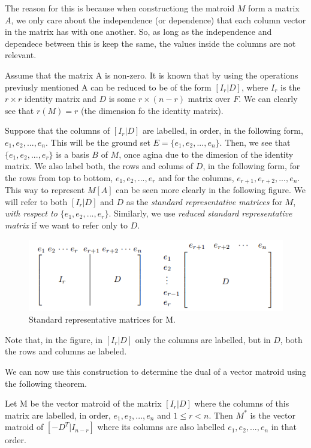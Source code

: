 The reason for this is because when constructiong the matroid $M$ form a matrix $A$, we only care about the independence (or dependence) that each column vector in the matrix has with one another. So, as long as the independence and dependece between this is keep the same, the values inside the columns are not relevant.

Assume that the matrix A is non-zero. It is known that by using the operations previusly mentioned A can be reduced to be of the form $[I_r|D]$, where $I_r$ is the $r \times r$ identity matrix and $D$ is some $r \times (n-r)$ matrix over $F$. We can clearly see that $r(M)=r$ (the dimension fo the identity matrix). 

Suppose that the columns of $[I_r|D]$ are labelled, in order, in the following form, $e_1, e_2,...,e_n$. This will be the ground set $E=\{e_1, e_2,...,e_n\}$. Then, we see that $\{e_1, e_2,...,e_r\}$ is a basis $B$ of $M$, once agina due to the dimesion of the identity matrix. We also label both, the rows and colums of $D$, in the following form, for the rows from top to bottom, $e_1, e_2,...,e_r$ and for the columns,  $e_{r+1}, e_{r+2},...,e_n$. This way to represent $M[A]$ can be seen more clearly in the following figure. We will refer to both $[I_r|D]$ and $D$ as the \textit{standard representative matrices} for $M$, \textit{with respect to $\{e_1, e_2,...,e_r\}$}. Similarly, we use \textit{reduced standard representative matrix} if we want to refer only to $D$.

\begin{figure}[H]
    \centering
    \includegraphics{SRF.png}
    \caption{Standard representative matrices for M. \cite{oxley1}}
    \label{fig:enter-label}
\end{figure}
Note that, in the figure, in $[I_r|D]$ only the columns are labelled, but in $D$, both the rows and columns ae labeled.

We can now use this construction to determine the dual of a vector matroid using the following theorem.

\begin{theorem}\label{DualRepMat}
    Let M be the vector matroid of the matrix $[I_r|D]$ where the columns of this matrix are labelled, in order, $e_1, e_2,...,e_n$ and $1\leq r< n$. Then $M^*$ is the vector matroid of $[-D^T|I_{n-r}]$ where its columns are also labelled $e_1, e_2,...,e_n$ in that order.
\end{theorem}

